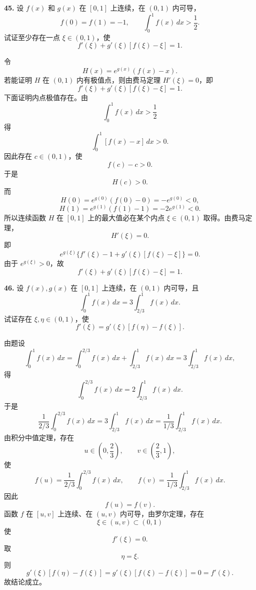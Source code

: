 \begin{problemblock}
\textbf{45.} 设 \(f(x)\) 和 \(g(x)\) 在 \([0,1]\) 上连续，在 \((0,1)\) 内可导，
\[
f(0)=f(1)=-1,\qquad \int_0^1 f(x)\,dx>\frac12.
\]
试证至少存在一点 \(\xi\in(0,1)\)，使
\[
f'(\xi)+g'(\xi)[f(\xi)-\xi]=1.
\]
\end{problemblock}

\begin{solutionblock}
令
\[
H(x)=e^{g(x)}(f(x)-x).
\]
若能证明 \(H\) 在 \((0,1)\) 内有极值点，则由费马定理 \(H'(\xi)=0\)，即
\[
f'(\xi)+g'(\xi)[f(\xi)-\xi]=1.
\]
下面证明内点极值存在。由
\[
\int_0^1 f(x)\,dx>\frac12
\]
得
\[
\int_0^1 [f(x)-x]\,dx>0.
\]
因此存在 \(c\in(0,1)\)，使
\[
f(c)-c>0.
\]
于是
\[
H(c)>0.
\]
而
\[
H(0)=e^{g(0)}(f(0)-0)=-e^{g(0)}<0,
\]
\[
H(1)=e^{g(1)}(f(1)-1)=-2e^{g(1)}<0.
\]
所以连续函数 \(H\) 在 \([0,1]\) 上的最大值必在某个内点 \(\xi\in(0,1)\) 取得。由费马定理，
\[
H'(\xi)=0.
\]
即
\[
e^{g(\xi)}\{f'(\xi)-1+g'(\xi)[f(\xi)-\xi]\}=0.
\]
由于 \(e^{g(\xi)}>0\)，故
\[
f'(\xi)+g'(\xi)[f(\xi)-\xi]=1.
\]
\end{solutionblock}

\begin{problemblock}
\textbf{46.} 设 \(f(x),g(x)\) 在 \([0,1]\) 上连续，在 \((0,1)\) 内可导，且
\[
\int_0^1 f(x)\,dx=3\int_{2/3}^1 f(x)\,dx.
\]
试证存在 \(\xi,\eta\in(0,1)\)，使
\[
f'(\xi)=g'(\xi)[f(\eta)-f(\xi)].
\]
\end{problemblock}

\begin{solutionblock}
由题设
\[
\int_0^1 f(x)\,dx
=\int_0^{2/3}f(x)\,dx+\int_{2/3}^1f(x)\,dx
=3\int_{2/3}^1f(x)\,dx,
\]
得
\[
\int_0^{2/3}f(x)\,dx=2\int_{2/3}^1f(x)\,dx.
\]
于是
\[
\frac{1}{2/3}\int_0^{2/3}f(x)\,dx
=3\int_{2/3}^1f(x)\,dx
=\frac{1}{1/3}\int_{2/3}^1f(x)\,dx.
\]
由积分中值定理，存在
\[
u\in\left(0,\frac23\right),\qquad v\in\left(\frac23,1\right),
\]
使
\[
f(u)=\frac{1}{2/3}\int_0^{2/3}f(x)\,dx,\qquad
f(v)=\frac{1}{1/3}\int_{2/3}^1f(x)\,dx.
\]
因此
\[
f(u)=f(v).
\]
函数 \(f\) 在 \([u,v]\) 上连续、在 \((u,v)\) 内可导，由罗尔定理，存在
\[
\xi\in(u,v)\subset(0,1)
\]
使
\[
f'(\xi)=0.
\]
取
\[
\eta=\xi.
\]
则
\[
g'(\xi)[f(\eta)-f(\xi)]
=g'(\xi)[f(\xi)-f(\xi)]
=0=f'(\xi).
\]
故结论成立。
\end{solutionblock}

